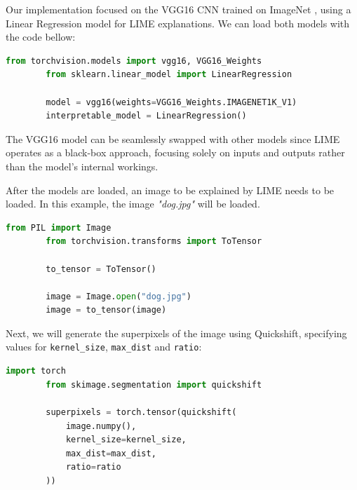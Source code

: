 Our implementation focused on the VGG16 CNN trained on ImageNet \citep{russakovsky2015imagenetlargescalevisual}, using a Linear Regression model for LIME explanations.
We can load both models with the code bellow:

\begin{program}
    \centering

    \begin{lstlisting}[language=Python, style=wider]
        from torchvision.models import vgg16, VGG16_Weights
        from sklearn.linear_model import LinearRegression

        model = vgg16(weights=VGG16_Weights.IMAGENET1K_V1)
        interpretable_model = LinearRegression()
    \end{lstlisting}
\end{program}


The VGG16 model can be seamlessly swapped with other models since LIME operates as a black-box approach, focusing solely on inputs and outputs rather than the model's internal workings.

After the models are loaded, an image to be explained by LIME needs to be loaded. In this example, the image \emph{"dog.jpg"} will be loaded.

\begin{program}
    \centering

    \begin{lstlisting}[language=Python, style=wider]
        from PIL import Image
        from torchvision.transforms import ToTensor
        
        to_tensor = ToTensor()
        
        image = Image.open("dog.jpg")
        image = to_tensor(image)
    \end{lstlisting}
\end{program}

Next, we will generate the superpixels of the image using Quickshift, specifying values for \texttt{kernel\_size}, \texttt{max\_dist} and \texttt{ratio}:

\begin{program}
    \centering

    \begin{lstlisting}[language=Python, style=wider]
        import torch
        from skimage.segmentation import quickshift
        
        superpixels = torch.tensor(quickshift(
            image.numpy(), 
            kernel_size=kernel_size, 
            max_dist=max_dist, 
            ratio=ratio
        ))
    \end{lstlisting}
\end{program}

